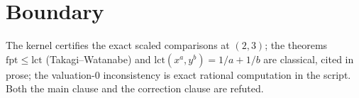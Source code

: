 \documentclass[11pt]{article}
\begin{document}
\section{Boundary}

The kernel certifies the exact scaled comparisons at $(2,3)$; the
theorems $\mathrm{fpt} \le \mathrm{lct}$ (Takagi--Watanabe) and
$\mathrm{lct}(x^a, y^b) = 1/a + 1/b$ are classical, cited in prose;
the valuation-0 inconsistency is exact rational computation in the
script.  Both the main clause and the correction clause are
refuted.
\end{document}
